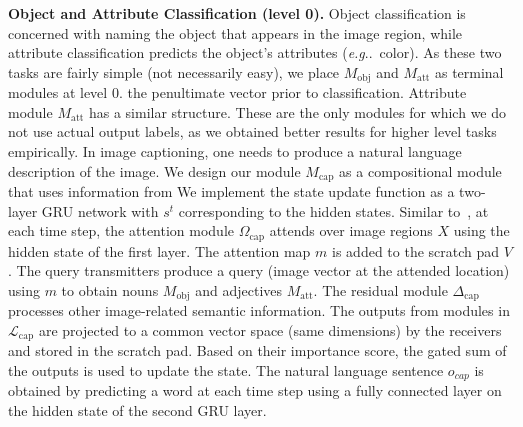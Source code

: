 \documentclass{article}
\makeatletter
\newcommand{\SK}[1]{{\color{NavyBlue}{[@Seung: #1]}}}
\def\Mobj{M_\mathrm{obj}}
\def\Matt{M_\mathrm{att}}
\def\Mcap{M_\mathrm{cap}}
\DeclareRobustCommand\onedot{\futurelet\@let@token\@onedot}
\def\@onedot{\ifx\@let@token.\else.\null\fi\xspace}
\def\eg{\emph{e.g}\onedot} \def\Eg{\emph{E.g}\onedot}
\def\ie{\emph{i.e}\onedot} \def\Ie{\emph{I.e}\onedot}
\makeatother
\begin{document}
\textbf{Object and Attribute Classification (level 0).}\hspace{2mm}
Object classification is concerned with naming the object that appears in the image region, while attribute classification predicts the object's attributes (\eg~color).
As these two tasks are fairly simple (not necessarily easy), we place $\Mobj$ and $\Matt$ as terminal modules at level $0$.
the penultimate vector prior to classification.
Attribute module $\Matt$ has a similar structure. %
These are the only modules for which we do not use actual output labels, as we obtained better results for higher level tasks empirically.
In image captioning, one needs to produce a natural language description of the image.
We design our module $\Mcap$ as a compositional module that uses information from
We implement the state update function as a two-layer GRU network with $s^t$ corresponding to the hidden states.
Similar to~\citet{anderson17}, at each time step, the attention module $\Omega_\mathrm{cap}$ attends over image regions $X$ using the hidden state of the first layer.
The attention map $m$ is added to the scratch pad $V$.
The query transmitters produce a query (image vector at the attended location) using $m$ to obtain  nouns $\Mobj$ and adjectives $\Matt$.
The residual module $\Delta_\mathrm{cap}$ processes other image-related semantic information.
The outputs from modules in $\mathcal L_\mathrm{cap}$ are projected to a common vector space (same dimensions) by the receivers and stored in the scratch pad.
Based on their importance score, the gated sum of the outputs is used to update the state.
The natural language sentence $o_{cap}$ is obtained by predicting a word at each time step using a fully connected layer on the hidden state of the second GRU layer.
\end{document}
